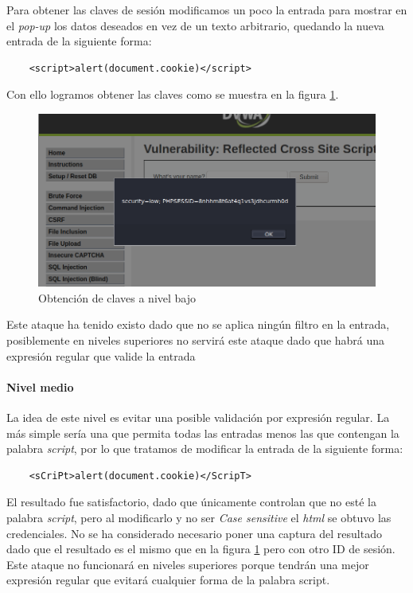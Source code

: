 Para obtener las claves de sesión modificamos un poco la entrada para mostrar en el {\it pop-up}
los datos deseados en vez de un texto arbitrario, quedando la nueva entrada de la siguiente forma:
\begin{lstlisting}
    <script>alert(document.cookie)</script>
\end{lstlisting}
Con ello logramos obtener las claves como se muestra en la figura \ref{fig:low}. 
\begin{figure}[ht!]
    \centering
    \includegraphics[width=14cm]{img/xss/low.png}
    \caption{Obtención de claves a nivel bajo}
    \label{fig:low}
\end{figure}
Este ataque ha tenido existo dado que no se aplica ningún filtro  en la entrada,
posiblemente en niveles superiores no servirá este ataque dado que habrá una expresión regular
que valide la entrada

\paragraph{Nivel medio} La idea de este nivel es evitar una posible validación por expresión regular. 
La más simple sería una que permita todas las entradas menos las que contengan la palabra {\it script}, por
lo que tratamos de modificar la entrada de la siguiente forma:
\begin{lstlisting}
    <sCriPt>alert(document.cookie)</ScripT>
\end{lstlisting}
El resultado fue satisfactorio, dado que únicamente controlan que no esté la palabra {\it script}, pero 
al modificarlo y no ser {\it Case sensitive} el {\it html} se obtuvo las credenciales. No se ha considerado necesario 
poner una captura del resultado dado que el resultado es el mismo que en la figura \ref{fig:low} pero con otro
ID de sesión. Este ataque no funcionará en niveles superiores porque tendrán una mejor expresión regular
que evitará cualquier forma de la palabra script.

